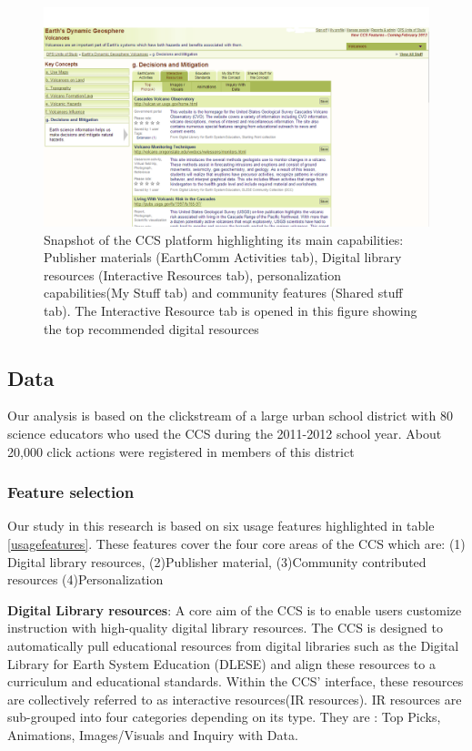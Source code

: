 \documentclass{acm_proc_article-sp}
\begin{document}
\begin{figure}
\includegraphics[width=1 \linewidth]{./ccsimage}
\caption{Snapshot of the CCS platform highlighting its main capabilities: Publisher materials (EarthComm Activities tab), Digital library resources (Interactive Resources tab), personalization capabilities(My Stuff tab) and community features (Shared stuff tab). The Interactive Resource tab is opened in this figure showing the top recommended digital resources}
\label{fig:ccsimage}
\end{figure}

\subsection{Data}
Our analysis is based on the clickstream of a large urban school district with 80 science educators who used the CCS during the 2011-2012 school year. About 20,000 click actions were registered in members of this district

\subsubsection{Feature selection}
Our study in this research is based on six usage features highlighted in table \ref{usagefeatures}. These features cover the four core areas of the CCS which are: (1) Digital library resources, (2)Publisher material, (3)Community contributed resources (4)Personalization
 
\textbf{Digital Library resources}:
A core aim of the CCS is to enable users customize instruction with high-quality digital library resources. The CCS is designed to automatically pull educational resources from digital libraries such as the Digital Library for Earth System Education (DLESE) and align these resources to a curriculum and educational standards. Within the CCS' interface, these resources are collectively referred to as interactive resources(IR resources). IR resources are sub-grouped into four categories depending on its type. They are : Top Picks, Animations, Images/Visuals and Inquiry with Data. 
\end{document}
